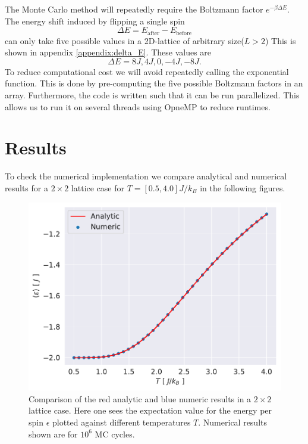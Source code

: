 \documentclass[english,notitlepage,reprint,nofootinbib]{revtex4-1}  %
\begin{document}
The Monte Carlo method will repeatedly require the Boltzmann factor $e^{-\beta \Delta E}$. The energy shift induced by flipping a single spin
\begin{equation}
    \Delta E = E_{\text{after}} - E_{\text{before}}
\end{equation}
can only take five possible values in a 2D-lattice of arbitrary size($L > 2$) This is shown in appendix \ref{appendix:delta_E}. These values are
\begin{equation}
    \Delta E = 8J, 4J, 0, -4J, -8J.
\end{equation}
To reduce computational cost we will avoid repeatedly calling the exponential function. This is done by pre-computing the five possible Boltzmann factors in an array.
Furthermore, the code is written such that it can be run parallelized. This allows us to run it on several threads using OpneMP to reduce runtimes.
\onecolumngrid
\newpage
\twocolumngrid
\section{Results}\label{sec:results}
To check the numerical implementation we compare analytical and numerical results for a $2\times2$ lattice case for $T=[0.5,4.0]J/k_B$ in the following figures.

\begin{figure}[H]
    \centering
    \includegraphics[width=.5\textwidth]{../figures/numeric_analytic_e_T.pdf}
    \caption{Comparison of the red analytic and blue numeric results in a $2\times2$ lattice case. Here one sees the expectation value for the energy per spin $\epsilon$ plotted against different temperatures $T$. Numerical results shown are for $10^6$ MC cycles.}
    \label{fig:numeric_analytic_e_T}
\end{figure}
\end{document}
